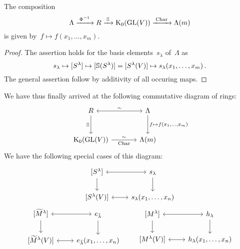 \documentclass[a4paper,10pt]{scrartcl}
\begin{document}
\begin{corollary}
  The composition
  \[
    \Lambda
    \xrightarrow{\;\Phi^{-1}\;}
    R
    \xrightarrow{\;\mathbb{S}\;}
    \operatorname{K}_0(\operatorname{GL}(V))
    \xrightarrow{\;\operatorname{Char}\;}
    \Lambda(m)
  \]
  is given by~$f \mapsto f(x_1, \dotsc, x_m)$.
\end{corollary}

\begin{proof}
  The assertion holds for the basis elements~$s_\lambda$ of~$\Lambda$ as
  \[
    s_\lambda
    \mapsto
    [S^\lambda]
    \mapsto
    [\mathbb{S}(S^\lambda)]
    =
    [S^\lambda(V)]
    \mapsto
    s_\lambda(x_1, \dotsc, x_m) \,.
  \]
  The general assertion follow by additivity of all occuring maps.
\end{proof}

We have thus finally arrived at the following commutative diagram of rings:
\[
  \begin{tikzcd}[sep = large]
    R
    \arrow[leftrightarrow]{r}{\sim}
    \arrow{d}[left]{\Schur}
    &
    \Lambda
    \arrow{d}[right]{f \mapsto f(x_1, \dotsc, x_m)}
    \\
    \K_0(\GL(V))
    \arrow{r}[above]{\sim}[below]{\Char}
    &
    \Lambda(m)
  \end{tikzcd}
\]
We have the following special cases of this diagram:
\begin{gather*}
  \begin{tikzcd}[ampersand replacement = \&]
    {[S^\lambda]}
    \arrow[leftrightarrow]{r}
    \arrow{d}
    \&
    s_\lambda
    \arrow{d}
    \\
    {[S^\lambda(V)]}
    \arrow[leftrightarrow]{r}
    \&
    s_\lambda(x_1, \dotsc, x_n)
  \end{tikzcd}
  \\
  \begin{tikzcd}[ampersand replacement = \&]
    {[\widetilde{M}^\lambda]}
    \arrow[leftrightarrow]{r}
    \arrow{d}
    \&
    e_{\tilde{\lambda}}
    \arrow{d}
    \\
    {[\widetilde{M}^\lambda(V)]}
    \arrow[leftrightarrow]{r}
    \&
    e_{\tilde{\lambda}}(x_1, \dotsc, x_n)
  \end{tikzcd}
  \qquad
  \begin{tikzcd}[ampersand replacement = \&]
    {[M^\lambda]}
    \arrow[leftrightarrow]{r}
    \arrow{d}
    \&
    h_\lambda
    \arrow{d}
    \\
    {[M^\lambda(V)]}
    \arrow[leftrightarrow]{r}
    \&
    h_\lambda(x_1, \dotsc, x_n)
  \end{tikzcd}
\end{gather*}
\end{document}
